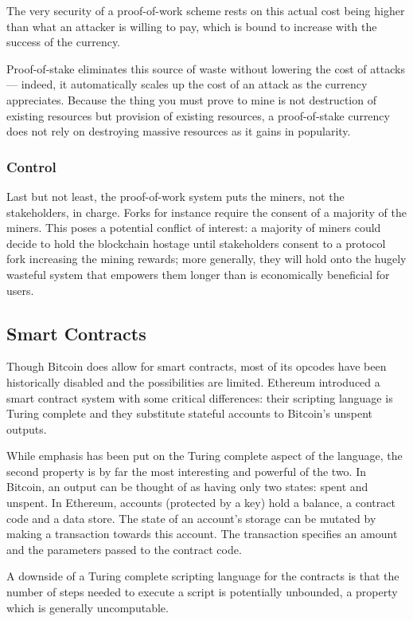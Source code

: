 \documentclass[letterpaper]{article}
\begin{document}
The very security of a proof-of-work scheme rests on this actual cost being
higher than what an attacker is willing to pay, which is bound to increase
with the success of the currency.

Proof-of-stake eliminates this source of waste without lowering the cost of
attacks --- indeed, it automatically scales up the cost of an attack as the
currency appreciates. Because the thing you must prove to mine is not
destruction of existing resources but provision of existing resources,
a proof-of-stake currency does not rely on destroying massive resources
as it gains in popularity.

\subsubsection{Control}
Last but not least, the proof-of-work system puts the miners,
not the stakeholders, in charge. Forks for instance require the consent of a
majority of the miners. This poses a potential conflict of interest: a majority
of miners could decide to hold the blockchain hostage until stakeholders consent
to a protocol fork increasing the mining rewards; more generally, they will hold
onto the hugely wasteful system that empowers them longer than is economically
beneficial for users.

\subsection{Smart Contracts}
Though Bitcoin does allow for smart contracts, most of its opcodes
have been historically disabled and the possibilities are limited.
Ethereum introduced a smart contract system with some critical differences:
their scripting language is Turing complete and they substitute
stateful accounts to Bitcoin's unspent outputs.

While emphasis has been put on the Turing complete aspect of the language,
the second property is by far the most interesting and powerful of the two.
In Bitcoin, an output can be thought of as having only two states: spent and
unspent. In Ethereum, accounts (protected by a key) hold a balance, a contract
code and a data store. The state of an account's storage can be mutated
by making a transaction towards this account. The transaction specifies an
amount and the parameters passed to the contract code.

A downside of a Turing complete scripting language for the contracts
is that the number of steps needed to execute a script is potentially unbounded,
a property which is generally uncomputable.
\end{document}
